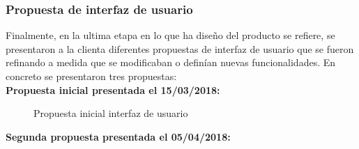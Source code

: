 \documentclass[11pt,a4paper]{article}
\begin{document}
\subsubsection{Propuesta de interfaz de usuario}
Finalmente, en la ultima etapa en lo que ha diseño del producto se refiere, se presentaron a la clienta diferentes propuestas de interfaz de usuario que se fueron refinando a medida que se modificaban o definían nuevas funcionalidades. En concreto se presentaron tres propuestas:
\\

\noindent\textbf{Propuesta inicial presentada el 15/03/2018:}

\begin{figure}[H]
\centering
{}
\caption{Propuesta inicial interfaz de usuario}
\end{figure}
\pagebreak 

\noindent\textbf{Segunda propuesta presentada el 05/04/2018:}
\end{document}
